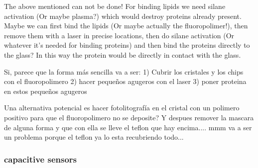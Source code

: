 \documentclass[12pt]{article}
\newcommand\wordcount{
   \immediate\write18{wordcount.bat \jobname.tex}
   
}
\begin{document}
 The above mentioned can not be done! For binding lipids we need silane activation (Or maybe plasma?) which would destroy proteins already present.
 Maybe we can first bind the lipids (Or maybe actually the fluoropolimer!), then remove them with a laser in precise locations, then do silane activation 
 (Or whatever it's needed for binding proteins) and then bind the proteins directly to the glass? In this way the protein would be directly in contact with the glass.


 Si, parece que la forma más sencilla va a ser:
 1) Cubrir los cristales y los chips con el fluoropolimero
 2) hacer pequeños agugeros con el laser
 3) poner proteina en estos pequeños agugeros
 
 Una alternativa potencial es hacer fotolitografía en el cristal con un polimero positivo para que el fluoropolimero no se deposite?
 Y despues remover la mascara de alguna forma y que con ella se lleve el teflon que hay encima.... mmm va a ser un problema porque el teflon ya lo esta recubriendo todo...


 \subsubsection*{capacitive sensors}


\wordcount

\newpage


\end{document}
